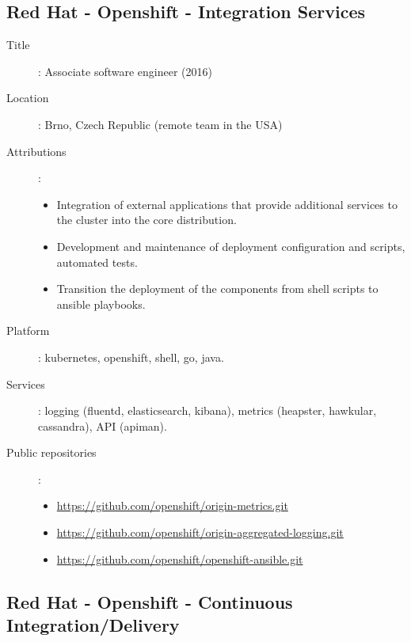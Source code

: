 \subsection*{Red Hat - Openshift - Integration Services}
\label{subsec:redhat}

\begin{description}
    \item[Title]: Associate software engineer (2016)
    \item[Location]: Brno, Czech Republic (remote team in the USA)
    \item[Attributions]:
        \begin{itemize}
            \item
                Integration of external applications that provide additional
                services to the cluster into the core distribution.
            \item
                Development and maintenance of deployment configuration and
                scripts, automated tests.
            \item
                Transition the deployment of the components from shell scripts
                to ansible playbooks.
        \end{itemize}
    \item[Platform]: kubernetes, openshift, shell, go, java.
    \item[Services]:
        logging (fluentd, elasticsearch, kibana), metrics (heapster, hawkular,
        cassandra), API (apiman).
    \item[Public repositories]:
        \begin{itemize}
            \item \url{https://github.com/openshift/origin-metrics.git}
            \item \url{https://github.com/openshift/origin-aggregated-logging.git}
            \item \url{https://github.com/openshift/openshift-ansible.git}
        \end{itemize}
\end{description}

\subsection*{Red Hat - Openshift - Continuous Integration/Delivery}

